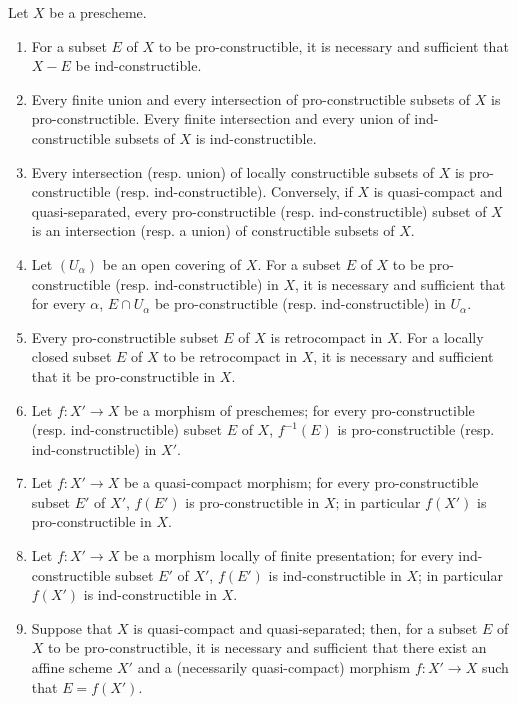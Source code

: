 \begin{proposition}[1.9.5]
\label{IV.1.9.5}
Let $X$ be a prescheme.
\begin{enumerate}
  \item[(i)] For a subset $E$ of $X$ to be pro-constructible, it is necessary
  and sufficient that $X-E$ be ind-constructible.
  \item[(ii)] Every finite union and every intersection of
  pro-constructible subsets of $X$ is pro-constructible. Every finite
  intersection and every union of ind-constructible subsets of $X$ is
  ind-constructible.
  \item[(iii)] Every intersection (resp. union) of locally constructible
  subsets of $X$ is pro-constructible (resp. ind-constructible).
  Conversely, if $X$ is quasi-compact and quasi-separated, every
  pro-constructible (resp. ind-constructible) subset of $X$ is an
  intersection (resp. a union) of constructible subsets of $X$.
  \item[(iv)] Let $(U_\alpha)$ be an open covering of $X$. For a subset $E$
  of $X$ to be pro-constructible (resp. ind-constructible) in $X$, it is
  necessary and sufficient that for every $\alpha$, $E\cap U_\alpha$ be
  pro-constructible (resp. ind-constructible) in $U_\alpha$.
  \item[(v)] Every pro-constructible subset $E$ of $X$ is retrocompact
  in $X$. For a locally closed subset $E$ of $X$ to be retrocompact in $X$,
  it is necessary and sufficient that it be pro-constructible in $X$.
  \item[(vi)] Let $f:X'\to X$ be a morphism of preschemes; for every
  pro-constructible (resp. ind-constructible) subset $E$ of $X$, $f^{-1}(E)$
  is pro-constructible (resp. ind-constructible) in $X'$.
  \item[(vii)] Let $f:X'\to X$ be a quasi-compact morphism; for every
  pro-constructible subset $E'$ of $X'$, $f(E')$ is pro-constructible in
  $X$; in particular $f(X')$ is pro-constructible in $X$.
  \item[(viii)] Let $f:X'\to X$ be a morphism locally of finite
  presentation; for every ind-constructible subset $E'$ of $X'$, $f(E')$ is
  ind-constructible in $X$; in particular $f(X')$ is ind-constructible
  in $X$.
  \item[(ix)] Suppose that $X$ is quasi-compact and quasi-separated; then,
  for a subset $E$ of $X$ to be pro-constructible, it is necessary and
  sufficient that there exist an affine scheme $X'$ and a (necessarily
  quasi-compact) morphism $f:X'\to X$ such that $E=f(X')$.
\end{enumerate}
\end{proposition}

